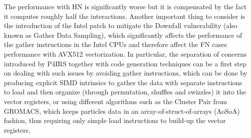\documentclass[preprint,12pt]{elsarticle}
\begin{document}
The performance with \ac{HN} is significantly worse but it is compensated by the fact it computes roughly half the interactions.
Another important thing to consider is the introduction of the Intel patch to mitigate the Downfall vulnerability (also known as Gather Data Sampling), which significantly affects the performance of the gather instructions in the Intel CPUs and therefore affect the \ac{FN} cases performance with AVX512 vectorization.
In particular, the separation of concerns introduced by P4IRS together with code generation techniques can be a first step on dealing with such issues by avoiding gather instructions, which can be done by producing explicit SIMD intrinsics to gather the data with separate instructions to load and then organize (through permutation, shuffles and swizzles) it into the vector registers, or using different algorithms such as the Cluster Pair from GROMACS, which keeps particles data in an array-of-struct-of-arrays (AoSoA) fashion, thus requiring only simple load instructions to build-up the vector registers.

\end{document}
